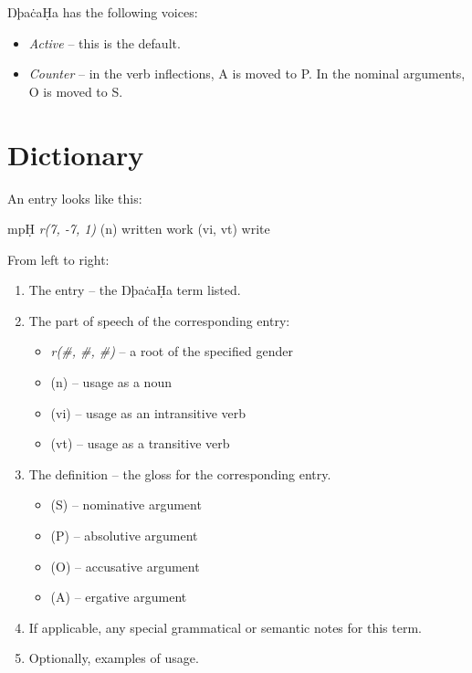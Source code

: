 \documentclass{book}
\newcommand{\lname}{ŊþaċaḤa}
\begin{document}
\lname{} has the following voices:

\begin{itemize}
  \item \emph{Active} -- this is the default.
  \item \emph{Counter}  -- in the verb inflections, A is moved to P. In the nominal arguments, O is moved to S.
\end{itemize}

\appendix

\chapter{Dictionary}

An entry looks like this:

\textsf{mpḤ} \textit{r(7, -7, 1)}
\quad (n) written work \quad (vi, vt) write

From left to right:

\begin{enumerate}
    \item The entry -- the \lname{} term listed.
    \item The part of speech of the corresponding entry:
    \begin{itemize}
        \item \textit{r(\#, \#, \#)} -- a root of the specified gender
        \item (n) -- usage as a noun
        \item (vi) -- usage as an intransitive verb
        \item (vt) -- usage as a transitive verb
    \end{itemize}
    \item The definition -- the gloss for the corresponding entry.
    \begin{itemize}
        \item (S) -- nominative argument
        \item (P) -- absolutive argument
        \item (O) -- accusative argument
        \item (A) -- ergative argument
    \end{itemize}
    \item If applicable, any special grammatical or semantic notes for this term.
    \item Optionally, examples of usage.
\end{enumerate}

\begin{multicols}{2}
    
\end{multicols}
\end{document}
